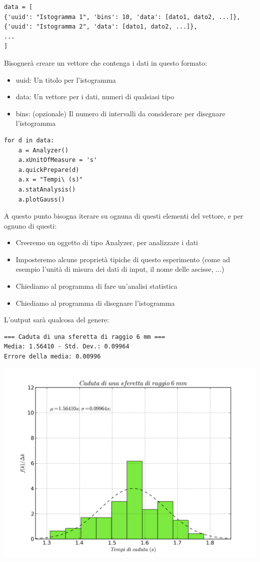 \begin{lstlisting}
data = [
{'uuid': "Istogramma 1", 'bins': 10, 'data': [dato1, dato2, ...]},
{'uuid': "Istogramma 2", 'data': [dato1, dato2, ...]},
...
]
\end{lstlisting}

Bisognerà creare un vettore che contenga i dati in questo formato:
\begin{itemize}
 \item uuid: Un titolo per l'istogramma
 \item data: Un vettore per i dati, numeri di qualsiasi tipo
 \item bins: (opzionale) Il numero di intervalli da considerare per disegnare l'istogramma
\end{itemize}

\begin{lstlisting}
for d in data:
    a = Analyzer()
    a.xUnitOfMeasure = 's'
    a.quickPrepare(d)
    a.x = "Tempi\ (s)"
    a.statAnalysis()
    a.plotGauss()
\end{lstlisting}

A questo punto bisogna iterare su ognuna di questi elementi del vettore, e per ognuno di questi:
\begin{itemize}
 \item Creeremo un oggetto di tipo Analyzer, per analizzare i dati
 \item Imposteremo alcune proprietà tipiche di questo esperimento (come ad esempio l'unità di misura dei dati di input, il nome delle ascisse, ...)
 \item Chiediamo al programma di fare un'analisi statistica
 \item Chiediamo al programma di disegnare l'istogramma
\end{itemize}

L'output sarà qualcosa del genere:
       
\begin{verbatim}
=== Caduta di una sferetta di raggio 6 mm ===
Media: 1.56410 - Std. Dev.: 0.09964
Errore della media: 0.00996
\end{verbatim}

\includegraphics[scale=0.75]{../grafici/esempio/Cadutadiunasferettadiraggio6mm.png}

